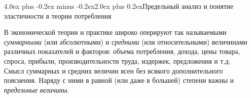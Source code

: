 \documentclass[12pt, 4paper]{book}
\makeatletter
\renewcommand{\section}{\@startsection{section}{1}{1pt}%
	{4.0ex plus -0.2ex minus -0.2ex}{2.0ex plus 0.2ex}{\centering\bf}}%
\makeatother
\begin{document}
{\begin{center}
\section {Предельный анализ и понятие эластичности в теории потребления}
\end{center}
\par

В экономической теории и практике широко оперируют так называемыми \textit{суммарными} (или абсолютными) и \textit{средними} (или относительными) величинами различных показателей и факторов: объема потребления, дохода, цены товара, спроса, прибыли, производительности труда, издержек, предложения и т.д. Смысл суммарных и средних величин ясен без всякого дополнительного пояснения. Наряду с ними в равной (или даже в большей) степени важны и \textit{предельные величины}.
\par

}
\end{document}
